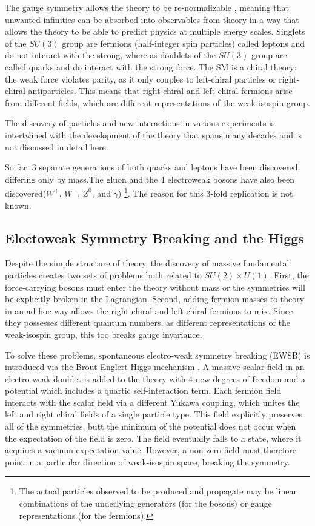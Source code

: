 The gauge symmetry allows the theory to be
re-normalizable \cite{1972.tHooft-Veltman.regularization_and_renormalization}, meaning that unwanted infinities can be absorbed into
observables from theory in a way that allows the theory to be able to predict
physics at multiple energy scales.  Singlets of the $SU(3)$ group are fermions
(half-integer spin particles) called leptons and do not interact with the strong, where as
doublets of the $SU(3)$ group are called quarks and do interact with the strong force. The SM is a chiral theory:
the weak force violates parity, as it only couples to left-chiral particles or
right-chiral antiparticles. This means that right-chiral and
left-chiral fermions arise from different fields, which are
different representations of the weak isospin group.
 

The discovery of particles and new interactions in various experiments
is intertwined with the development of the theory that spans many
decades and is not discussed in detail here. 

So far, 3 separate generations of both quarks and leptons have been discovered,
differing only by mass.The gluon and the 4 electroweak bosons have also been
discovered($W^+$, $W^-$, $Z^0$, and $\gamma$) \footnote{The actual particles
observed to be produced and propagate may be linear combinations of the
underlying generators (for the bosons) or gauge representations (for the
fermions).}.  The reason for this 3-fold replication is not known. 




\subsection{Electoweak Symmetry Breaking and the Higgs}

Despite the simple structure of theory, the discovery of massive fundamental
particles creates two sets of problems both related to $SU(2) \times U(1)$. First, the force-carrying bosons must enter the theory
without mass or the symmetries will be explicitly broken in the Lagrangian. Second, adding
fermion masses to theory in an ad-hoc way allows the right-chiral and
left-chiral fermions to mix. Since they possesses different quantum numbers, as
different representations of the weak-isospin group, this too breaks gauge
invariance. 

To solve these problems, spontaneous electro-weak symmetry breaking (EWSB) is
introduced via the Brout-Englert-Higgs mechanism \cite{Higgs:1964pj, Higgs:1966ev,Englert:1964et}. A  massive scalar field
in an electro-weak doublet is added to the theory with 4 new
degrees of freedom and a potential which includes a 
quartic self-interaction term. Each fermion field interacts with the scalar field via
a different Yukawa coupling, which unites the left and right chiral fields
of a single particle type.  This field
explicitly preserves all of the symmetries, butt the minimum of the potential does not
occur when the expectation of the field is zero. The field
eventually falls to a state, where it acquires a vacuum-expectation
value. However, a non-zero field must therefore point in a
particular direction of weak-isospin space, breaking the symmetry.

